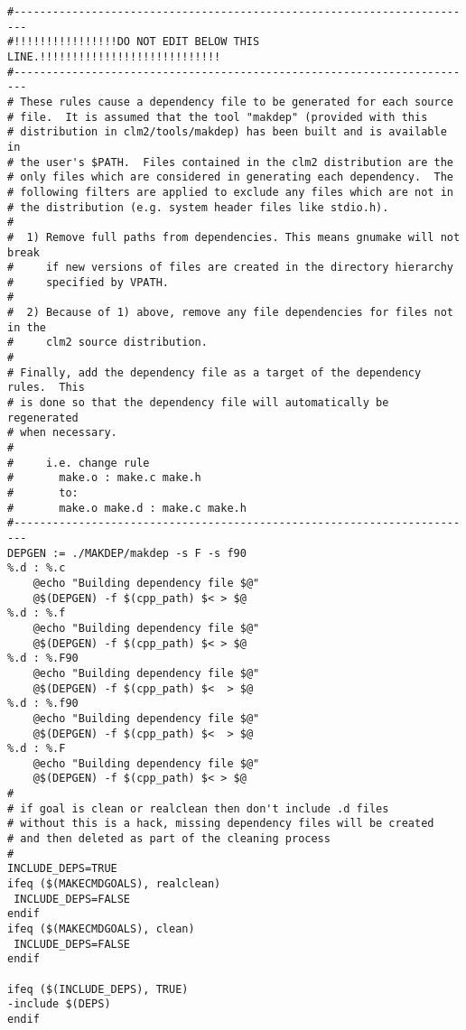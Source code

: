 \begin{verbatim}
#------------------------------------------------------------------------
#!!!!!!!!!!!!!!!!DO NOT EDIT BELOW THIS LINE.!!!!!!!!!!!!!!!!!!!!!!!!!!!!
#------------------------------------------------------------------------
# These rules cause a dependency file to be generated for each source
# file.  It is assumed that the tool "makdep" (provided with this
# distribution in clm2/tools/makdep) has been built and is available in
# the user's $PATH.  Files contained in the clm2 distribution are the
# only files which are considered in generating each dependency.  The
# following filters are applied to exclude any files which are not in
# the distribution (e.g. system header files like stdio.h).
#
#  1) Remove full paths from dependencies. This means gnumake will not break
#     if new versions of files are created in the directory hierarchy
#     specified by VPATH.
#
#  2) Because of 1) above, remove any file dependencies for files not in the
#     clm2 source distribution.
#
# Finally, add the dependency file as a target of the dependency rules.  This
# is done so that the dependency file will automatically be regenerated
# when necessary.
#
#     i.e. change rule
#       make.o : make.c make.h
#       to:
#       make.o make.d : make.c make.h
#------------------------------------------------------------------------
DEPGEN := ./MAKDEP/makdep -s F -s f90
%.d : %.c
	@echo "Building dependency file $@"
	@$(DEPGEN) -f $(cpp_path) $< > $@
%.d : %.f
	@echo "Building dependency file $@"
	@$(DEPGEN) -f $(cpp_path) $< > $@
%.d : %.F90
	@echo "Building dependency file $@"
	@$(DEPGEN) -f $(cpp_path) $<  > $@
%.d : %.f90
	@echo "Building dependency file $@"
	@$(DEPGEN) -f $(cpp_path) $<  > $@
%.d : %.F
	@echo "Building dependency file $@"
	@$(DEPGEN) -f $(cpp_path) $< > $@
#
# if goal is clean or realclean then don't include .d files
# without this is a hack, missing dependency files will be created
# and then deleted as part of the cleaning process
#
INCLUDE_DEPS=TRUE
ifeq ($(MAKECMDGOALS), realclean)
 INCLUDE_DEPS=FALSE
endif
ifeq ($(MAKECMDGOALS), clean)
 INCLUDE_DEPS=FALSE
endif

ifeq ($(INCLUDE_DEPS), TRUE)
-include $(DEPS)
endif

\end{verbatim}


